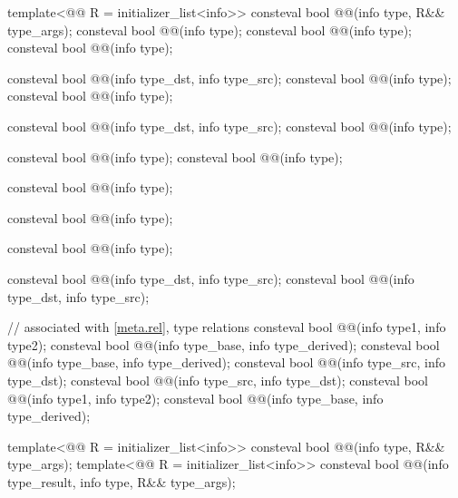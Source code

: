 \begin{codeblock}
template<@@ R = initializer_list<info>>
  consteval bool @@(info type, R&& type_args);
consteval bool @@(info type);
consteval bool @@(info type);
consteval bool @@(info type);

consteval bool @@(info type_dst, info type_src);
consteval bool @@(info type);
consteval bool @@(info type);

consteval bool @@(info type_dst, info type_src);
consteval bool @@(info type);

consteval bool @@(info type);
consteval bool @@(info type);

consteval bool @@(info type);

consteval bool @@(info type);

consteval bool @@(info type);

consteval bool @@(info type_dst, info type_src);
consteval bool @@(info type_dst, info type_src);

// associated with \ref{meta.rel}, type relations
consteval bool @@(info type1, info type2);
consteval bool @@(info type_base, info type_derived);
consteval bool @@(info type_base, info type_derived);
consteval bool @@(info type_src, info type_dst);
consteval bool @@(info type_src, info type_dst);
consteval bool @@(info type1, info type2);
consteval bool
  @@(info type_base, info type_derived);

template<@@ R = initializer_list<info>>
  consteval bool @@(info type, R&& type_args);
template<@@ R = initializer_list<info>>
  consteval bool @@(info type_result, info type, R&& type_args);


\end{codeblock}
